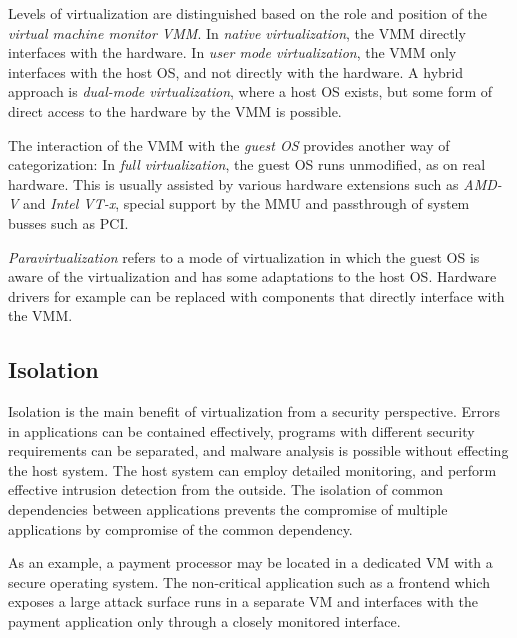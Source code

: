 Levels of virtualization are distinguished based on the role and position of the
\emph{virtual machine monitor VMM}. In \emph{native virtualization}, the VMM
directly interfaces with the hardware. In \emph{user mode virtualization}, the
VMM only interfaces with the host OS, and not directly with the hardware. A
hybrid approach is \emph{dual-mode virtualization}, where a host OS exists, but
some form of direct access to the hardware by the VMM is possible.

The interaction of the VMM with the \emph{guest OS} provides another way of
categorization: In \emph{full virtualization}, the guest OS runs unmodified, as
on real hardware. This is usually assisted by various hardware extensions such
as \textit{AMD-V} and \textit{Intel VT-x}, special support by the MMU and
passthrough of system busses such as PCI.

\emph{Paravirtualization} refers to a mode of virtualization in which the guest
OS is aware of the virtualization and has some adaptations to the host OS.
Hardware drivers for example can be replaced with components that directly
interface with the VMM.

\subsection{Isolation}
Isolation is the main benefit of virtualization from a security perspective.
Errors in applications can be contained effectively, programs with different
security requirements can be separated, and malware analysis is possible without
effecting the host system. The host system can employ detailed monitoring, and
perform effective intrusion detection from the outside. The isolation of common
dependencies between applications prevents the compromise of multiple
applications by compromise of the common dependency.

As an example, a payment processor may be located in a dedicated VM with a
secure operating system. The non-critical application such as a frontend which
exposes a large attack surface runs in a separate VM and interfaces with the
payment application only through a closely monitored interface.


